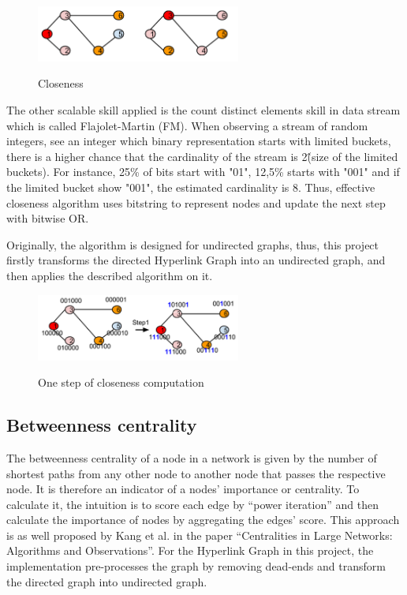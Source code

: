 \begin{figure}[h]
	\begin{center}
		\label{fig3}		
		\includegraphics[width=0.6\textwidth]{fig3}	
		\caption{Closeness}	
	\end{center}
\end{figure}

The other scalable skill applied is the count distinct elements skill in data stream which is called Flajolet-Martin (FM).  When observing a stream of random integers, see an integer which binary representation starts with limited buckets, there is a higher chance that the cardinality of the stream is 2\^(size of the limited buckets). For instance, 25\% of bits start with "01", 12,5\% starts with "001" and if the limited bucket show "001", the estimated cardinality is 8. Thus, effective closeness algorithm uses bitstring to represent nodes and update the next step with bitwise OR. 

Originally, the algorithm is designed for undirected graphs, thus, this project firstly transforms the directed Hyperlink Graph into an undirected graph, and then applies the described algorithm on it.

\begin{figure}[h]
	\begin{center}
		\label{fig4}		
		\includegraphics[width=0.6\textwidth]{fig4}	
		\caption{One step of closeness computation}	
	\end{center}
\end{figure}

\subsection{Betweenness centrality}
The betweenness centrality of a node in a network is given by the number of shortest paths from any other node to another node that passes the respective node. It is therefore an indicator of a nodes’ importance or centrality. To calculate it, the intuition is to score each edge by “power iteration” and then calculate the importance of nodes by aggregating the edges’ score. This approach is as well proposed by Kang et al. in the paper “Centralities in Large Networks: Algorithms and Observations”. For the Hyperlink Graph in this project, the implementation pre-processes the graph by removing dead-ends and transform the directed graph into undirected graph.

